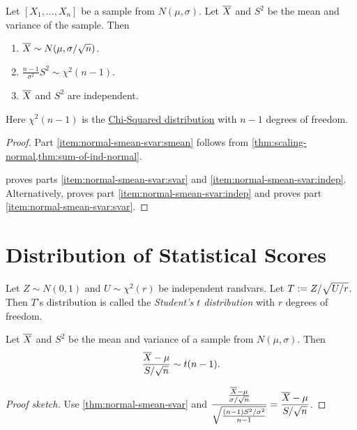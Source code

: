 \documentclass[a4paper, 12pt, fleqn]{article}
\begin{document}
\begin{theorem}
\label{thm:normal-smean-svar}
Let $[X_1, \ldots, X_n]$ be a sample from $N(\mu, \sigma)$.
Let $\overline{X}$ and $S^2$ be the mean and variance of the sample. Then
\begin{enumerate}
\item\label{item:normal-smean-svar:smean}$\overline{X} \sim N(\mu, \sigma/\sqrt{n})$.
\item\label{item:normal-smean-svar:svar}$\frac{n-1}{\sigma^2}S^2 \sim \chi^2(n-1)$.
\item\label{item:normal-smean-svar:indep}$\overline{X}$ and $S^2$ are independent.
\end{enumerate}
Here $\chi^2(n-1)$ is the
\href{https://en.wikipedia.org/wiki/Chi-squared_distribution}{Chi-Squared distribution}
with $n-1$ degrees of freedom.
\end{theorem}
\begin{proof}
Part \ref{item:normal-smean-svar:smean} follows from \cref{thm:scaling-normal,thm:sum-of-ind-normal}.

\cite{duke.stat.mean-var-indep} proves parts \ref{item:normal-smean-svar:svar}
and \ref{item:normal-smean-svar:indep}.
Alternatively, \cite{se.math.50598} proves part \ref{item:normal-smean-svar:indep}
and \cite{psu.stat414.svar} proves part \ref{item:normal-smean-svar:svar}.
\end{proof}

\section{Distribution of Statistical Scores}

\begin{definition}
Let $Z \sim N(0, 1)$ and $U \sim \chi^2(r)$ be independent randvars.
Let $T := Z/\sqrt{U/r}$. Then $T$'s distribution is called the
\emph{Student's $t$ distribution} with $r$ degrees of freedom.
\end{definition}

\begin{theorem}
Let $\overline{X}$ and $S^2$ be the mean and variance of a sample from $N(\mu, \sigma)$. Then
\[ \frac{\overline{X} - \mu}{S/\sqrt{n}} \sim t(n-1). \]
\end{theorem}
\begin{proof}[Proof sketch]
Use \cref{thm:normal-smean-svar} and
$\displaystyle \frac{\frac{\overline{X} - \mu}{\sigma/\sqrt{n}}}{\sqrt{\frac{(n-1)S^2/\sigma^2}{n-1}}}
= \frac{\overline{X} - \mu}{S/\sqrt{n}}$.
\end{proof}
\end{document}
